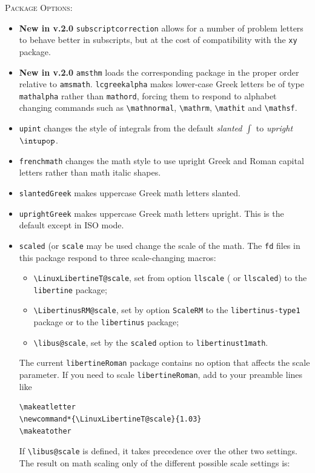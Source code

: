 \documentclass{article}
\begin{document}
\textsc{Package Options:}
\begin{itemize}
\item
\textbf{New in v.2.0} {\tt subscriptcorrection} allows for a number of problem letters to behave better in subscripts, but at the cost of compatibility with the {\tt xy} package.
\item \textbf{New in v.2.0} {\tt amsthm} loads the corresponding package in the proper order relative to {\tt amsmath}.
{\tt lcgreekalpha} makes lower-case Greek letters be of type {\tt mathalpha} rather than {\tt mathord}, forcing them to respond to alphabet changing commands such as \verb|\mathnormal|, \verb|\mathrm|, \verb|\mathit| and \verb|\mathsf|.
\item
{\tt upint} changes the style of integrals from the default \emph{slanted} $\int$ to \emph{upright} $\intupop$.
\item {\tt frenchmath} changes the math style to use upright Greek and Roman capital letters rather than math italic shapes.
\item
{\tt slantedGreek} makes uppercase Greek math letters slanted. 
\item {\tt uprightGreek} makes uppercase Greek math letters upright. This is the default except in ISO mode.
\item
{\tt scaled} (or {\tt scale} may be used change the scale of the math. The {\tt fd} files in this package respond to three scale-changing macros: 
\begin{itemize}
\item
\verb|\LinuxLibertineT@scale|, set from option {\tt llscale} ( or {\tt llscaled}) to the {\tt libertine} package;
\item
\verb|\LibertinusRM@scale|, set by option {\tt ScaleRM} to the {\tt libertinus-type1} package or to the {\tt libertinus} package;
\item
\verb|\libus@scale|, set by the {\tt scaled} option to {\tt libertinust1math}.
\end{itemize}
 The current {\tt libertineRoman} package contains no option that affects the scale parameter. If you need to scale {\tt libertineRoman}, add to your preamble lines like
\begin{verbatim}
\makeatletter
\newcommand*{\LinuxLibertineT@scale}{1.03}
\makeatother
\end{verbatim}
 If \verb|\libus@scale| is defined, it takes precedence over the other two settings. The result on math scaling only of the different possible scale settings  is:
\begin{itemize}

\end{itemize}
\end{itemize}
\end{document}
